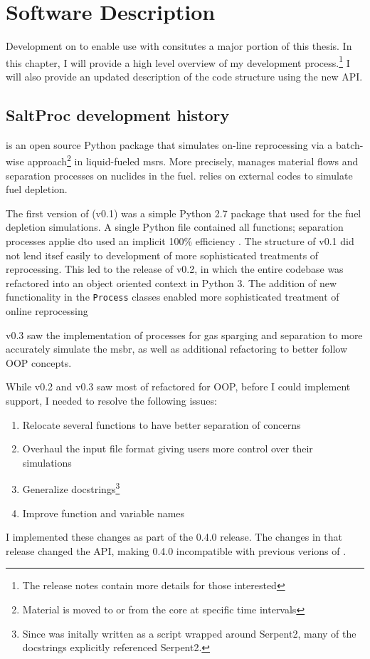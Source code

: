 \chapter{Software Description}
Development on \SaltProc to enable use with \OpenMC consitutes a major portion
of this thesis. In this chapter, I will provide a high level overview
of my development process.\footnote{The release notes
contain more details for those interested} I will also provide an updated
description of the code structure using the new API. 

\section{SaltProc development history}%
\label{sub:saltproc-hisory}

\SaltProc\cite{rykhlevskii_saltproc_2018} is an open source Python package that
simulates on-line reprocessing via a batch-wise approach\footnote{Material is
moved to or from the core at specific time intervals} in liquid-fueled
\Gls{msr}s. More precisely, \SaltProc manages material flows and separation
processes on nuclides in the fuel. \SaltProc relies on external codes to simulate
fuel depletion.

The first version of \SaltProc (v0.1) was a simple Python 2.7 package that used
\SerpentTWO for the fuel depletion simulations. A single Python file contained
all functions; separation processes applie dto  used an implicit 100\%
efficiency \cite{rykhlevskii_advanced_2018}. The structure of \SaltProc v0.1 did
not lend itsef easily to development of more sophisticated treatments of
reprocessing. This led to the release of \SaltProc v0.2, in which the entire
codebase was refactored into an object oriented context in Python 3. The
addition of new functionality in the \verb.Process. classes enabled more
sophisticated treatment of online reprocessing \cite{rykhlevskii_fuel_2020} 

\SaltProc v0.3 saw the implementation of processes for gas sparging and
separation to more accurately simulate the \gls{msbr}, as well as additional
refactoring to better follow OOP concepts.

While v0.2 and v0.3 saw most of \SaltProc refactored for OOP, before I could
implement \OpenMC support, I needed to resolve the following issues:
\begin{enumerate}
    \item Relocate several functions to have better separation of concerns
    \item Overhaul the \SaltProc input file format giving users more control over their simulations
    \item Generalize docstrings\footnote{Since \SaltProc was initally written as a script wrapped around Serpent2, many of the docstrings explicitly referenced Serpent2.}
    \item Improve function and variable names
\end{enumerate}
I implemented these changes as part of the 0.4.0 release. The changes in that
release changed the API, making 0.4.0 incompatible with previous verions of \SaltProc.

